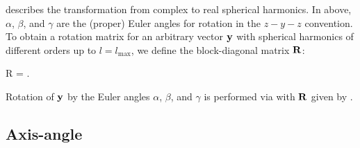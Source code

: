 \documentclass[modern]{aastex61}
\begin{document}
%
describes the transformation from complex to real spherical harmonics. In
 above, $\alpha$, $\beta$, and $\gamma$ are the (proper) Euler angles
for rotation in the $z-y-z$ convention.
%
To obtain a rotation matrix for an arbitrary vector ${\mathbf{y}}$ with spherical
harmonics of different orders up to $l = l_\mathrm{max}$, we define the
block-diagonal matrix ${\mathbf{R}}$:
%
\begin{proof*}{R}
    \label{eq:rblockdiag}
     =
        \quad.
\end{proof*}
%
Rotation of ${\mathbf{y}}$ by the Euler angles $\alpha$, $\beta$, and $\gamma$
is performed via  with ${\mathbf{R}}$ given by .

\subsection{Axis-angle}
\label{app:axisangle}
\end{document}

